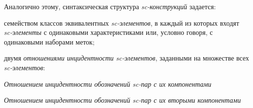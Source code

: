 Аналогично этому, синтаксическая структура \textit{sc-конструкций} задается:
\begin{textitemize}
	\item семейством классов  эквивалентных \textit{sc-элементов}, в каждый из которых входят \textit{sc-элементы} с одинаковыми  характеристиками или, условно говоря, с одинаковыми наборами  меток;
	\item двумя  \textit{отношениями инцидентности sc-элементов}, заданными на множестве всех \textit{sc-элементов}:
	\begin{textitemize}
		\item \textit{Отношением инцидентности обозначений sc-пар с их компонентами}
		\item \textit{Отношением инцидентности обозначений  sc-пар с их вторыми компонентами}\\
	\end{textitemize}
\end{textitemize}

